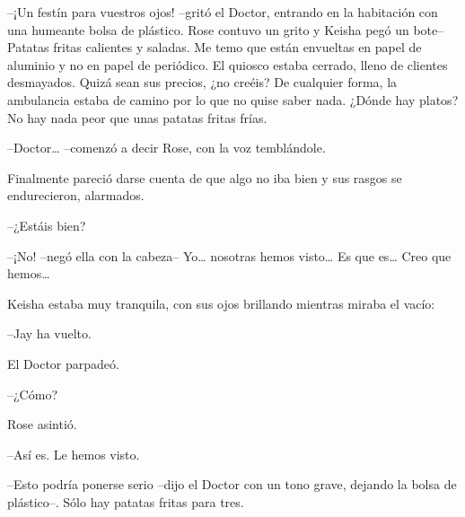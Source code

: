 {--¡Un festín para vuestros ojos! --gritó el Doctor, entrando en la
 habitación con una humeante bolsa de plástico. Rose contuvo un grito y
 Keisha pegó un bote-- Patatas fritas calientes y saladas. Me temo que
 están envueltas en papel de aluminio y no en papel de periódico. El
 quiosco estaba cerrado, lleno de clientes desmayados. Quizá sean sus
 precios, ¿no creéis? De cualquier forma, la ambulancia estaba de camino
 por lo que no quise saber nada. ¿Dónde hay platos? No hay nada peor que
unas patatas fritas frías.}

{--Doctor\ldots{} --comenzó a decir Rose, con la voz temblándole.}

{Finalmente pareció darse cuenta de que algo no iba bien y sus rasgos se
endurecieron, alarmados.}

{--¿Estáis bien?}

{--¡No! --negó ella con la cabeza-- Yo\ldots{} nosotras hemos
 visto\ldots{} Es que es\ldots{} Creo que hemos\ldots{}}

{Keisha estaba muy tranquila, con sus ojos brillando mientras miraba el
vacío:}

{--Jay ha vuelto.}

{El Doctor parpadeó.}

{--¿Cómo?}

{Rose asintió.}

{--Así es. Le hemos visto.}

{--Esto podría ponerse serio --dijo el Doctor con un tono grave, dejando
la bolsa de plástico--. Sólo hay patatas fritas para tres.}
